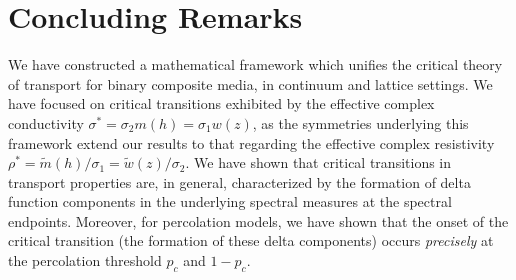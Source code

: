 \documentclass[english,12pt,jmp,graphicx]{revtex4-1}
\begin{document}
%
%

\section{Concluding Remarks}
%
We have constructed a mathematical framework which unifies the critical
theory of transport for binary composite media, in continuum and
lattice settings. We have focused on critical transitions exhibited by
the effective complex conductivity $\sigma^*=\sigma_2m(h)=\sigma_1w(z)$, as the
symmetries underlying this framework extend our results to that
regarding the effective complex resistivity
$\rho^*=\tilde{m}(h)/\sigma_1=\tilde{w}(z)/\sigma_2$. We have
shown that critical transitions in transport properties are, in
general, characterized by the formation of delta function components
in the underlying spectral measures at the spectral
endpoints. Moreover, for percolation models, we have shown that the
onset of the critical transition (the formation of these delta
components) occurs \emph{precisely} at the percolation threshold $p_c$
and $1-p_c$.        
\end{document}
